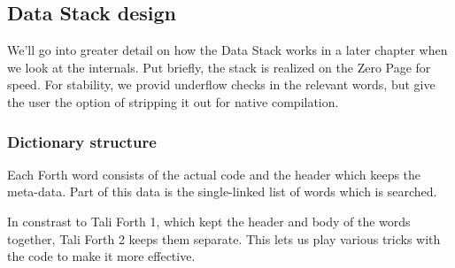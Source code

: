 \subsection{Data Stack design}

We'll go into greater detail on how the Data Stack works in a later chapter when
we look at the internals. Put briefly, the stack is realized on the Zero
Page for speed. For stability, we provid underflow
checks in the relevant words, but give the user the
option of stripping it out for native compilation.


\subsubsection{Dictionary structure}

Each Forth word consists of the actual code and the header which
keeps the meta-data. Part of this data is the single-linked list of words which
is searched. 

In constrast to Tali Forth 1, which kept the header and body
of the words together, Tali Forth 2 keeps them separate. This lets us play
various tricks with the code to make it more effective.
